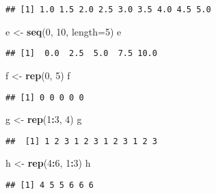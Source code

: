 \documentclass[]{article}
\newenvironment{Shaded}{\begin{snugshade}}{\end{snugshade}}
\newcommand{\KeywordTok}[1]{\textcolor[rgb]{0.13,0.29,0.53}{\textbf{#1}}}
\newcommand{\DataTypeTok}[1]{\textcolor[rgb]{0.13,0.29,0.53}{#1}}
\newcommand{\DecValTok}[1]{\textcolor[rgb]{0.00,0.00,0.81}{#1}}
\newcommand{\StringTok}[1]{\textcolor[rgb]{0.31,0.60,0.02}{#1}}
\newcommand{\OperatorTok}[1]{\textcolor[rgb]{0.81,0.36,0.00}{\textbf{#1}}}
\newcommand{\NormalTok}[1]{#1}
\begin{document}
\begin{verbatim}
## [1] 1.0 1.5 2.0 2.5 3.0 3.5 4.0 4.5 5.0
\end{verbatim}

\begin{Shaded}
\begin{Highlighting}[]
\NormalTok{e <-}\StringTok{ }\KeywordTok{seq}\NormalTok{(}\DecValTok{0}\NormalTok{, }\DecValTok{10}\NormalTok{, }\DataTypeTok{length=}\DecValTok{5}\NormalTok{)}
\NormalTok{e}
\end{Highlighting}
\end{Shaded}

\begin{verbatim}
## [1]  0.0  2.5  5.0  7.5 10.0
\end{verbatim}

\begin{Shaded}
\begin{Highlighting}[]
\NormalTok{f <-}\StringTok{ }\KeywordTok{rep}\NormalTok{(}\DecValTok{0}\NormalTok{, }\DecValTok{5}\NormalTok{)}
\NormalTok{f}
\end{Highlighting}
\end{Shaded}

\begin{verbatim}
## [1] 0 0 0 0 0
\end{verbatim}

\begin{Shaded}
\begin{Highlighting}[]
\NormalTok{g <-}\StringTok{ }\KeywordTok{rep}\NormalTok{(}\DecValTok{1}\OperatorTok{:}\DecValTok{3}\NormalTok{, }\DecValTok{4}\NormalTok{)}
\NormalTok{g}
\end{Highlighting}
\end{Shaded}

\begin{verbatim}
##  [1] 1 2 3 1 2 3 1 2 3 1 2 3
\end{verbatim}

\begin{Shaded}
\begin{Highlighting}[]
\NormalTok{h <-}\StringTok{ }\KeywordTok{rep}\NormalTok{(}\DecValTok{4}\OperatorTok{:}\DecValTok{6}\NormalTok{, }\DecValTok{1}\OperatorTok{:}\DecValTok{3}\NormalTok{)}
\NormalTok{h}
\end{Highlighting}
\end{Shaded}

\begin{verbatim}
## [1] 4 5 5 6 6 6
\end{verbatim}
\end{document}
